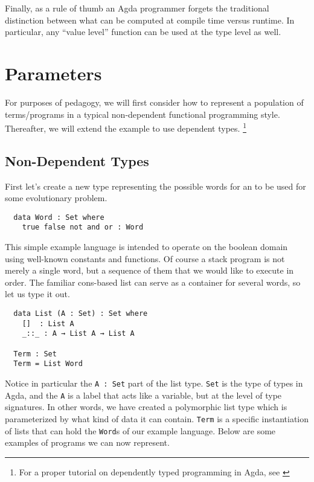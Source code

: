 \documentclass{acm_proc_article-sp}
\begin{document}
Finally, as a rule of thumb an Agda programmer forgets the traditional
distinction between what can be computed at compile time versus runtime. In
particular, any ``value level'' function can be used at the type level
as well.

\section{Parameters}

For purposes of pedagogy, we will first consider how to represent a
population of terms/programs in a typical non-dependent functional
programming style. Thereafter, we will extend the example to use
dependent types.
\footnote{For a proper tutorial on dependently typed programming in Agda, see \cite{norell:agdatut}}

\subsection{Non-Dependent Types}

First let's create a new type representing the possible words for an
to be used for some evolutionary problem.

\begin{verbatim}
  data Word : Set where
    true false not and or : Word
\end{verbatim}

This simple example language is intended to operate on the boolean domain using
well-known constants and functions. Of course a stack program is not
merely a single word, but a sequence of them that we would like to
execute in order. The familiar cons-based list can serve as a
container for several words, so let us type it out.

\begin{verbatim}
  data List (A : Set) : Set where
    []  : List A
    _::_ : A → List A → List A

  Term : Set
  Term = List Word
\end{verbatim}

Notice in particular the \texttt{A : Set} part of the list
type. \texttt{Set} is the type of types in Agda, and the \texttt{A} is
a label that acts like a variable, but at the level of type
signatures. In other words, we have created a polymorphic list type
which is parameterized by what kind of data it can
contain. \texttt{Term} is a specific instantiation of lists that can
hold the \texttt{Word}s of our example language. Below are some
examples of programs we can now represent.
\end{document}
